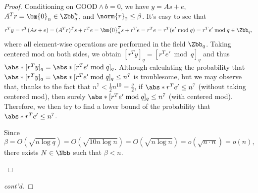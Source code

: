 \begin{answer}[iii]
\begin{proof}
        Conditioning on $\textrm{GOOD} \land b=0$, we have $y=As+e$, $A^Tr=\bm{0}_n \in \Zbb_q^{n}$, and $\norm{r}_2\le \beta$.  It's easy to see that
        \[
            r^Ty=r^T(As+e)=(A^Tr)^Ts + r^Te=\bm{0}_n^Ts+r^Te=r^Te=r^T(e' \bmod q)=r^Te' \bmod q \in\Zbb_q,
        \]
        where all element-wise operations are performed in the field $\Zbb_q$. Taking centered mod on both sides, we obtain $[r^Ty]_q = [r^Te' \bmod q ]_q$ and thus $\abs*{[r^Ty]_q} = \abs*{[r^Te'\bmod q ]_q}$. Although calculating the probability that $\abs*{[r^Ty]_q}=\abs*{[r^Te'\bmod q ]_q}\le n^7$ is troublesome, but we may observe that, thanks to the fact that $n^7\lt \frac{1}{2}n^{10}=\frac{q}{2}$, if $\abs*{r^Te'}\le n^7$ (without taking centered mod), then surely $\abs*{[r^Te'\bmod q ]_q}\le n^7$ (with centered mod). Therefore, we then try to find a lower bound of the probability that $\abs*{r^Te'}\le n^7$.


        \begin{observation}\label{obs:p1-3-1}
            Since \[\beta=O(\sqrt{n\log q})=O(\sqrt{10 n\log n})=O(\sqrt{n\log n})=o(\sqrt{ n\cdot n})=o(n),\]
            there exists $N\in\Nbb$ such that $\beta\lt n$.
        \end{observation}
        \vspace{-1cm}
        \end{proof}\begin{proof}[cont'd]
        

\end{proof}
\end{answer}
